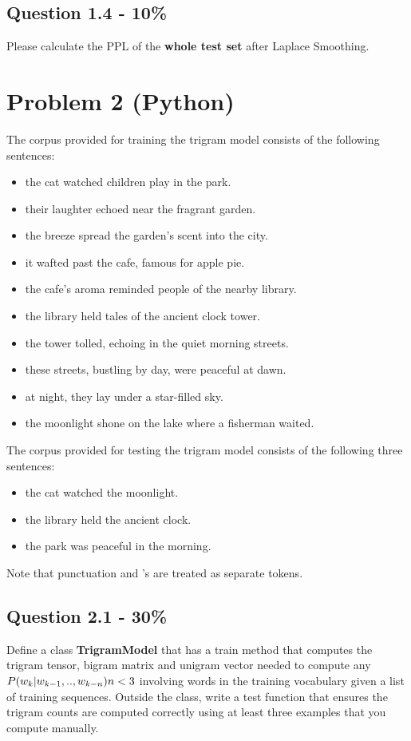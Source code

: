 \documentclass{article}
\newcommand{\answerboxbig}{
    \vspace{20cm} %
}
\begin{document}
\subsection*{Question 1.4 - 10\%}
Please calculate the PPL of the \textbf{whole test set} after Laplace Smoothing. 
\answerboxbig


\section*{Problem 2 (Python)}
The corpus provided for training the trigram model consists of the 
following sentences:

\begin{itemize}
    \item the cat watched children play in the park.
    \item their laughter echoed near the fragrant garden.
    \item the breeze spread the garden's scent into the city.
    \item it wafted past the cafe, famous for apple pie.
    \item the cafe's aroma reminded people of the nearby library.
    \item the library held tales of the ancient clock tower.
    \item the tower tolled, echoing in the quiet morning streets.
    \item these streets, bustling by day, were peaceful at dawn.
    \item at night, they lay under a star-filled sky.
    \item the moonlight shone on the lake where a fisherman waited.
\end{itemize}

The corpus provided for testing the trigram model consists of the following 
three sentences:

\begin{itemize}
    \item the cat watched the moonlight.
    \item the library held the ancient clock.
    \item the park was peaceful in the morning.
\end{itemize}

Note that punctuation and 's are treated as separate tokens.

\subsection*{Question 2.1 - 30\%}
Define a class \textbf{TrigramModel} that has a train method that computes the trigram tensor, bigram matrix and unigram vector needed to compute any $P(w_k|w_{k-1},.., w_{k-n}) \\ n<3$ involving words in the training vocabulary given a list of training sequences. Outside the class, write a test function that ensures the trigram counts are computed correctly using at least three examples that you compute manually.
\end{document}
